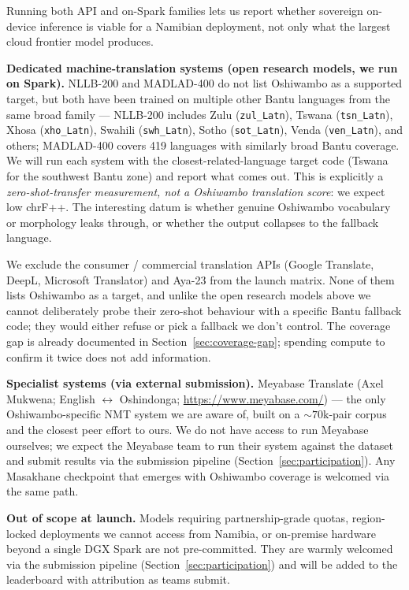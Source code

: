 \documentclass[11pt]{article}
\begin{document}
Running both API and on-Spark families lets us report whether
sovereign on-device inference is viable for a Namibian deployment,
not only what the largest cloud frontier model produces.

\textbf{Dedicated machine-translation systems (open research
models, we run on Spark).} NLLB-200 \citep{costajussa2022nllb} and
MADLAD-400 \citep{kudugunta2023madlad} do not list Oshiwambo as a
supported target, but both have been trained on multiple other
Bantu languages from the same broad family --- NLLB-200 includes
Zulu (\texttt{zul\_Latn}), Tswana (\texttt{tsn\_Latn}), Xhosa
(\texttt{xho\_Latn}), Swahili (\texttt{swh\_Latn}), Sotho
(\texttt{sot\_Latn}), Venda (\texttt{ven\_Latn}), and others;
MADLAD-400 covers 419 languages with similarly broad Bantu coverage.
We will run each system with the closest-related-language target
code (Tswana for the southwest Bantu zone) and report what comes
out. This is explicitly a \emph{zero-shot-transfer measurement,
not a Oshiwambo translation score}: we expect low chrF++. The
interesting datum is whether genuine Oshiwambo vocabulary or
morphology leaks through, or whether the output collapses to the
fallback language.

We exclude the consumer / commercial translation APIs (Google
Translate, DeepL, Microsoft Translator) and Aya-23
\citep{aryabumi2024aya} from the launch matrix. None of them lists
Oshiwambo as a target, and unlike the open research models above
we cannot deliberately probe their zero-shot behaviour with a
specific Bantu fallback code; they would either refuse or pick a
fallback we don't control. The coverage gap is already documented
in Section~\ref{sec:coverage-gap}; spending compute to confirm it
twice does not add information.

\textbf{Specialist systems (via external submission).} Meyabase
Translate (Axel Mukwena; English $\leftrightarrow$ Oshindonga;
\url{https://www.meyabase.com/}) --- the only Oshiwambo-specific
NMT system we are aware of, built on a $\sim 70$k-pair corpus and
the closest peer effort to ours. We do not have access to run
Meyabase ourselves; we expect the Meyabase team to run their system
against the dataset and submit results via the submission pipeline
(Section~\ref{sec:participation}). Any Masakhane checkpoint that
emerges with Oshiwambo coverage is welcomed via the same path.

\textbf{Out of scope at launch.} Models requiring partnership-grade
quotas, region-locked deployments we cannot access from Namibia, or
on-premise hardware beyond a single DGX Spark are not pre-committed.
They are warmly welcomed via the submission pipeline
(Section~\ref{sec:participation}) and will be added to the
leaderboard with attribution as teams submit.
\end{document}
